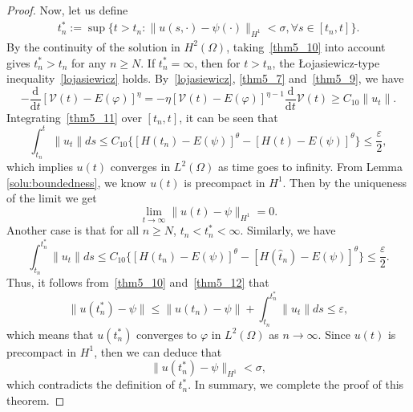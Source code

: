 \documentclass{elsarticle}
\begin{document}
\begin{proof}
Now, let us define
\begin{eqnarray*}
	t^{\ast}_{n} :=\sup\{t>t_n: \|u(s, \cdot)-\psi(\cdot) \|_{H^1}<\sigma, \forall s\in [t_n, t] \}.
\end{eqnarray*}
By the continuity of the solution in $H^2(\Omega)$, taking~\eqref{thm5_10} into account gives $t^{\ast}_{n} > t_n$ for any $n\geqslant N$. If $t^{\ast}_{n}= \infty$, then for $t>t_n$, the {\L}ojasiewicz-type inequality~\eqref{lojasiewicz} holds. By~\eqref{lojasiewicz}, \eqref{thm5_7} and~\eqref{thm5_9}, we have
 \begin{equation}\label{thm5_11}
-\frac{\mathrm{d}}{\mathrm{d}t}[\mathcal{V}(t) - E(\varphi)]^{\eta}=-\eta [\mathcal{V}(t) - E(\varphi)]^{\eta-1}\frac{\mathrm{d}}{\mathrm{d}t}\mathcal{V}(t)\geqslant C_{10}\|u_t\|.
\end{equation} 
Integrating~\eqref{thm5_11} over $[t_n, t]$, it can be seen that
\[
	\int_{t_n}^{t}\|u_{t}\|ds\leq C_{10}\{[H(t_n)-E(\psi)]^{\theta} -[H(t)-E(\psi)]^{\theta}\}\leq  \frac{\varepsilon}{2},
\]
which implies $u(t)$ converges in $L^2(\Omega)$ as time goes to infinity. From Lemma \ref{solu:boundedness}, we know $u(t)$ is precompact in $H^1$. Then by the uniqueness of the limit we get 
\[
	\lim_{t\rightarrow\infty}\| u(t)-\psi\|_{H^1}=0.
\]
Another case is that for all $n \geq N$, $t_n<t^{\ast}_{n} < \infty$. Similarly, we have
\begin{equation}\label{thm5_12}
	\int_{t_n}^{t^{\ast}_n}\|u_{t}\|ds\leq C_{10}\{ [H(t_n)-E(\psi)]^{\theta} -[H(\hat{t}_n)-E(\psi)]^{\theta}\} \leq  \frac{\varepsilon}{2}.
\end{equation}
Thus, it follows from~\eqref{thm5_10} and~\eqref{thm5_12} that
\begin{equation*}
	\| u(t^{\ast}_n)-\psi\| \leq \| u(t_n)-\psi\|+ \int_{t_n}^{t^{\ast}_n}\|u_{t}\|ds \leq  \varepsilon,
\end{equation*}
which means that $u(t^{\ast}_n)$ converges to $\varphi$ in $L^2(\Omega)$ as $n \rightarrow\infty$. Since $u(t)$ is precompact in $H^1$, then we can deduce that
\[
	\| u(t^{\ast}_n)-\psi\|_{H^1}< \sigma,
\]
which contradicts the definition of $t^{\ast}_n$. In summary, we complete the proof of this theorem.
\end{proof}
\end{document}
